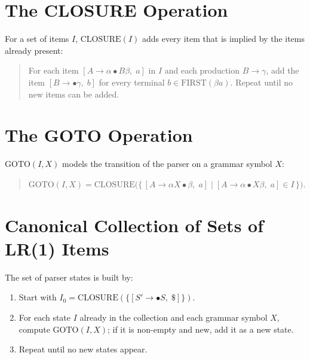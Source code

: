 \documentclass[11pt,a4paper]{report}
\begin{document}
\section{The CLOSURE Operation}
For a set of items $I$, $\mathrm{CLOSURE}(I)$ adds every item that is implied by
the items already present:
\begin{quote}
For each item $[A \rightarrow \alpha \bullet B\beta,\; a]$ in $I$ and each
production $B \rightarrow \gamma$, add the item
$[B \rightarrow \bullet \gamma,\; b]$ for every terminal
$b \in \mathrm{FIRST}(\beta a)$. Repeat until no new items can be added.
\end{quote}

\section{The GOTO Operation}
$\mathrm{GOTO}(I, X)$ models the transition of the parser on a grammar symbol $X$:
\begin{quote}
$\mathrm{GOTO}(I, X) = \mathrm{CLOSURE}\big(\{\,[A \rightarrow \alpha X \bullet \beta,\; a] \mid [A \rightarrow \alpha \bullet X\beta,\; a] \in I\,\}\big).$
\end{quote}

\section{Canonical Collection of Sets of LR(1) Items}
The set of parser states is built by:
\begin{enumerate}
  \item Start with $I_0 = \mathrm{CLOSURE}(\{[S' \rightarrow \bullet S,\; \$]\})$.
  \item For each state $I$ already in the collection and each grammar symbol $X$, compute $\mathrm{GOTO}(I, X)$; if it is non-empty and new, add it as a new state.
  \item Repeat until no new states appear.
\end{enumerate}
\end{document}
